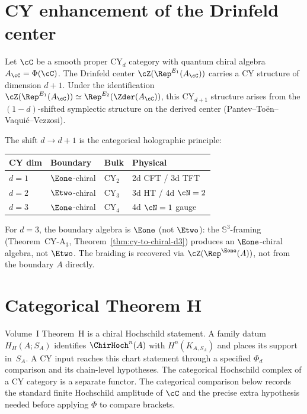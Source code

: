 \section{CY enhancement of the Drinfeld center}
\label{sec:cy-drinfeld}

\begin{theorem}
\label{thm:cy-drinfeld-center}
Let $\cC$ be a smooth proper CY$_d$ category with quantum chiral
algebra $A_\cC = \Phi(\cC)$. The Drinfeld center
$\cZ(\Rep^{E_1}(A_\cC))$ carries a CY structure of dimension $d+1$.
Under the identification
$\cZ(\Rep^{E_1}(A_\cC)) \simeq \Rep^{E_2}(\Zder(A_\cC))$, this
CY$_{d+1}$ structure arises from the $(1-d)$-shifted symplectic
structure on the derived center (Pantev--To\"en--Vaqui\'e--Vezzosi).
\end{theorem}

\begin{remark}
\label{rem:cy-dimensional-hierarchy}
The shift $d \to d+1$ is the categorical holographic principle:
\begin{center}
\begin{tabular}{llll}
\toprule
CY dim & Boundary & Bulk & Physical \\
\midrule
$d = 1$ & $\Eone$-chiral & CY$_2$ & 2d CFT / 3d TFT \\
$d = 2$ & $\Etwo$-chiral & CY$_3$ & 3d HT / 4d $\cN=2$ \\
$d = 3$ & $\Eone$-chiral & CY$_4$ & 4d $\cN=1$ gauge \\
\bottomrule
\end{tabular}
\end{center}
For $d = 3$, the boundary algebra is $\Eone$ (not $\Etwo$):
the $\mathbb{S}^3$-framing (Theorem~CY-A$_3$, Theorem~\ref{thm:cy-to-chiral-d3})
produces an $\Eone$-chiral algebra, not $\Etwo$. The braiding is recovered
via $\cZ(\Rep^{\Eone}(A))$, not from the boundary $A$ directly.
\end{remark}


\section{Categorical Theorem H}
\label{sec:categorical-thm-h}

Volume~I Theorem~H is a chiral Hochschild statement.  A family datum
$H_H(A;S_A)$ identifies $\ChirHoch^n(A)$ with
$H^n(K_{A,S_A})$ and places its support in~$S_A$.  A CY input reaches
this chart statement through a specified $\Phi_d$ comparison and its
chain-level hypotheses.  The categorical Hochschild complex of a CY
category is a separate functor.
The categorical comparison below records the standard finite
Hochschild amplitude of $\cC$ and the precise extra hypothesis
needed before applying $\Phi$ to compare brackets.

